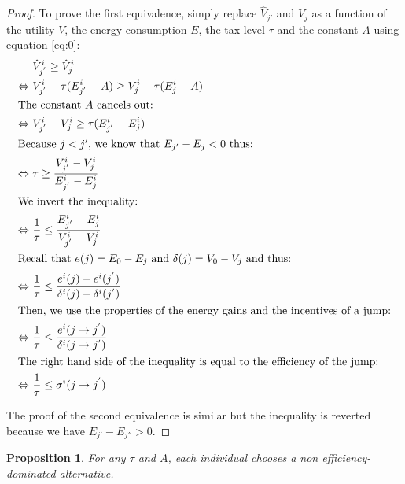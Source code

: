 \documentclass[empty, english]{javaudin}
\newtheorem{propo}{Proposition}
\begin{document}
\begin{proof}
	To prove the first equivalence, simply replace $\hat{V}_{j'}$ and $\hat{V}_j$ as a function of the utility $V$, the energy consumption $E$, the tax level $\tau$ and the constant $A$ using equation \eqref{eq:0}:
	\begin{align*}
		& \hat{V}_{j^{'}}^i \geq \hat{V}_{j}^i \\
		\Leftrightarrow~ & V^i_{j^{'}} - \tau(E_{j^{'}}^i - A) \geq V^i_{j} - \tau(E_{j}^i - A) \\
		\intertext{The constant $A$ cancels out:}
		\Leftrightarrow~ & V^i_{j^{'}} - V^i_{j} \geq \tau (E_{j^{'}}^i - E_{j}^i) \\
		\intertext{Because $j < j'$, we know that $E_{j'} - E_j < 0$ thus:}
		\Leftrightarrow~ & \tau \geq \frac{V^i_{j^{'}} - V^i_{j}}{E_{j^{'}}^i - E^i_{j}} \\
		\intertext{We invert the inequality:}
		\Leftrightarrow~ & \frac{1}{\tau} \leq \frac{E_{j^{'}}^i - E^i_{j}}{V^i_{j^{'}} - V^i_{j}} \\
		\intertext{Recall that $e(j) = E_0 - E_j$ and $\delta(j) = V_0 - V_j$ and thus:}
		\Leftrightarrow~ & \frac{1}{\tau} \leq \frac{e^i(j) - e^i(j^{'})}{\delta^i(j) - \delta^i(j^{'})} \\
		\intertext{Then, we use the properties of the energy gains and the incentives of a jump:}
		\Leftrightarrow~ & \frac{1}{\tau} \leq \frac{e^i(j\rightarrow j^{'})}{\delta^i(j\rightarrow j^{'})} \\
		\intertext{The right hand side of the inequality is equal to the efficiency of the jump:}
		\Leftrightarrow~ & \frac{1}{\tau} \leq \sigma^i(j \rightarrow j^{'})
	\end{align*}
	
The proof of the second equivalence is similar but the inequality is reverted because we have $E_{j'} - E_{j''} > 0$.

\end{proof}

\begin{propo}
	\label{propo1}
	For any $\tau$ and $A$, each individual chooses a non efficiency-dominated alternative.
\end{propo}
\end{document}
